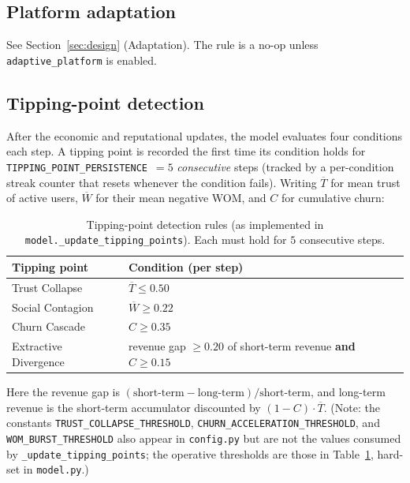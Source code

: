 \documentclass[11pt]{article}
\newcommand{\code}[1]{\texttt{#1}}
\begin{document}
\subsection{Platform adaptation}
\label{sub:adaptation}

See Section~\ref{sec:design} (Adaptation). The rule is a no-op unless
\code{adaptive\_platform} is enabled.

\subsection{Tipping-point detection}
\label{sec:tipping}

After the economic and reputational updates, the model evaluates four conditions
each step. A tipping point is recorded the first time its condition holds for
\code{TIPPING\_POINT\_PERSISTENCE}~$=5$ \emph{consecutive} steps (tracked by a
per-condition streak counter that resets whenever the condition fails). Writing
$\overline{T}$ for mean trust of active users, $\overline{W}$ for their mean
negative WOM, and $C$ for cumulative churn:

\begin{table}[!ht]
\centering
\caption{Tipping-point detection rules (as implemented in
\code{model.\_update\_tipping\_points}). Each must hold for $5$ consecutive steps.}
\label{tab:tipping}
\small
\begin{tabular}{ll}
\toprule
Tipping point & Condition (per step) \\
\midrule
Trust Collapse        & $\overline{T} \le 0.50$ \\
Social Contagion      & $\overline{W} \ge 0.22$ \\
Churn Cascade         & $C \ge 0.35$ \\
Extractive Divergence & revenue gap $\ge 0.20$ of short-term revenue \;\textbf{and}\; $C \ge 0.15$ \\
\bottomrule
\end{tabular}
\end{table}

\noindent Here the revenue gap is
$(\text{short-term} - \text{long-term})/\text{short-term}$, and long-term revenue
is the short-term accumulator discounted by $(1-C)\cdot\overline{T}$. (Note: the
constants \code{TRUST\_COLLAPSE\_THRESHOLD}, \code{CHURN\_ACCELERATION\_THRESHOLD},
and \code{WOM\_BURST\_THRESHOLD} also appear in \code{config.py} but are not the
values consumed by \code{\_update\_tipping\_points}; the operative thresholds are
those in Table~\ref{tab:tipping}, hard-set in \code{model.py}.)
\end{document}
